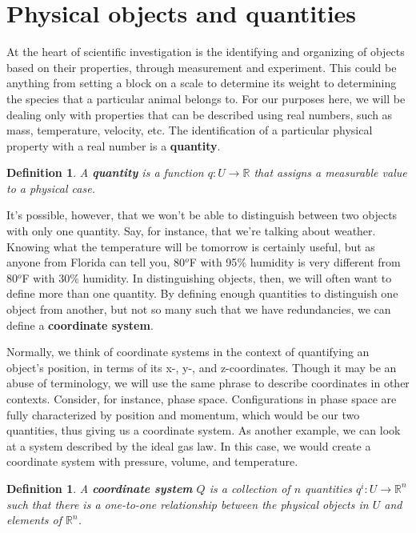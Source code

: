 \documentclass{book}
\newtheorem{defn}[equation]{Definition}
\begin{document}
\section{Physical objects and quantities}

At the heart of scientific investigation is the identifying and organizing of objects based on their properties, through measurement and experiment. This could be anything from setting a block on a scale to determine its weight to determining the species that a particular animal belongs to. For our purposes here, we will be dealing only with properties that can be described using real numbers, such as mass, temperature, velocity, etc. The identification of a particular physical property with a real number is a \textbf{quantity}.

\begin{defn}
	A \textbf{quantity} is a function $q : U \to \mathbb{R}$ that assigns a measurable value to a physical case.
\end{defn}



It's possible, however, that we won't be able to distinguish between two objects with only one quantity. Say, for instance, that we're talking about weather. Knowing what the temperature will be tomorrow is certainly useful, but as anyone from Florida can tell you, 80$^o$F with 95$\%$ humidity is very different from 80$^o$F with 30$\%$ humidity. In distinguishing objects, then, we will often want to define more than one quantity. By defining enough quantities to distinguish one object from another, but not so many such that we have redundancies, we can define a \textbf{coordinate system}.


Normally, we think of coordinate systems in the context of quantifying an object's position, in terms of its x-, y-, and z-coordinates. Though it may be an abuse of terminology, we will use the same phrase to describe coordinates in other contexts. Consider, for instance, phase space. Configurations in phase space are fully characterized by position and momentum, which would be our two quantities, thus giving us a coordinate system. As another example, we can look at a system described by the ideal gas law. In this case, we would create a coordinate system with pressure, volume, and temperature. 

\begin{defn}
	A \textbf{coordinate system} $Q$ is a collection of $n$ quantities $q^i : U \to \mathbb{R}^n$ such that there is a one-to-one relationship between the physical objects in $U$ and elements of $\mathbb{R}^n$.
\end{defn}
\end{document}
